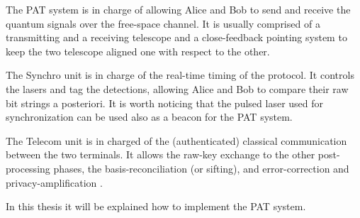 The PAT system is in charge of allowing Alice and Bob to send and receive the quantum signals over the free-space channel. It is usually comprised of a transmitting and a receiving telescope and a close-feedback pointing system to keep the two telescope aligned one with respect to the other.

The Synchro unit is in charge of the real-time timing of the protocol. It controls the lasers and tag the detections, allowing Alice and Bob to compare their raw bit strings a posteriori. It is worth noticing that the pulsed laser used for synchronization can be used also as a beacon for the PAT system.

The Telecom unit is in charged of the (authenticated) classical communication between the two terminals. It allows the raw-key exchange to the other post-processing phases, the basis-reconciliation (or sifting), and error-correction and privacy-amplification \cite{a9}.

In this thesis it will be explained how to implement the PAT system.